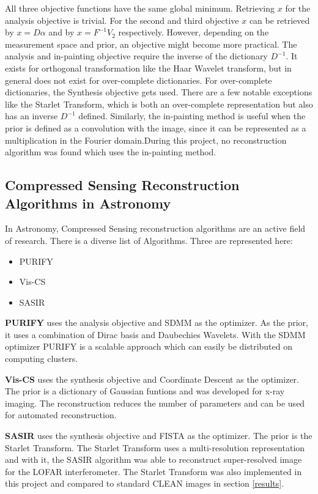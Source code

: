 All three objective functions have the same global minimum. Retrieving $x$ for the analysis objective is trivial. For the second and third objective $x$ can be retrieved by $x = D\alpha$ and by $x = F^{-1}V_2$ respectively. However, depending on the measurement space and prior, an objective might become more practical. The analysis and in-painting objective require the inverse of the dictionary $D^{-1}$. It exists for orthogonal transformation like the Haar Wavelet transform, but in general does not exist for over-complete dictionaries. For over-complete dictionaries, the Synthesis objective gets used. There are a few notable exceptions like the Starlet Transform, which is both an over-complete representation but also has an inverse $D^{-1}$ defined. Similarly, the in-painting method is useful when the prior is defined as a convolution with the image, since it can be represented as a multiplication in the Fourier domain.During this project, no reconstruction algorithm was found which uses the in-painting method.


\subsection{Compressed Sensing Reconstruction Algorithms in Astronomy}
In Astronomy, Compressed Sensing reconstruction algorithms are an active field of research. There is a diverse list of Algorithms. Three are represented here:
\begin{itemize}
	\item PURIFY \cite{carrillo2014purify}
	\item Vis-CS \cite{felix2017compressed}
	\item SASIR \cite{girard2015sparse}
\end{itemize}

\textbf{PURIFY} uses the analysis objective and SDMM as the optimizer. As the prior, it uses a combination of Dirac basis and Daubechies Wavelets. With the SDMM optimizer PURIFY is a scalable approach which can easily be distributed on computing clusters.

\textbf{Vis-CS} uses the synthesis objective and Coordinate Descent as the optimizer. The prior is a dictionary of Gaussian funtions and was developed for x-ray imaging. The reconstruction reduces the number of parameters and can be used for automated reconstruction. 

\textbf{SASIR} uses the synthesis objective and FISTA as the optimizer. The prior is the Starlet Transform. The Starlet Transform uses a multi-resolution representation and with it, the SASIR algorithm was able to reconstruct super-resolved image for the LOFAR interferometer. The Starlet Transform was also implemented in this project and compared to standard CLEAN images in section \ref{results}.


